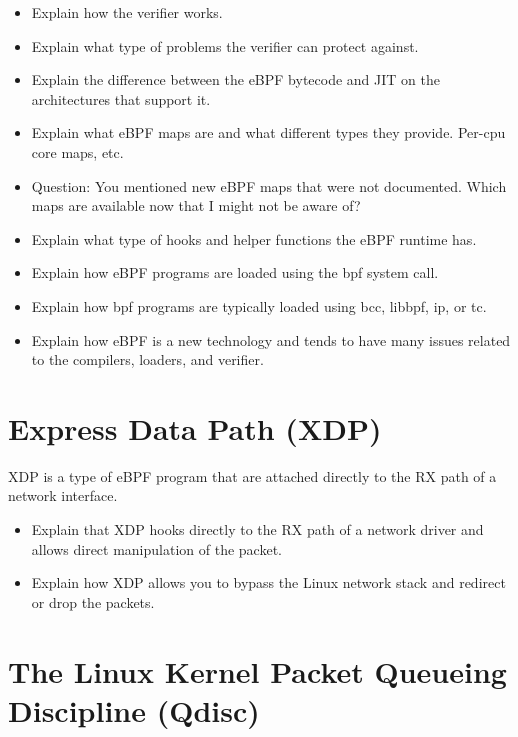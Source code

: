 \documentclass[sigconf, nonacm]{acmart}
\begin{document}
\begin{itemize}
  \item Explain how the verifier works.
  \item Explain what type of problems the verifier can protect against.
  \item Explain the difference between the eBPF bytecode and JIT on the architectures that support it.
  \item Explain what eBPF maps are and what different types they provide. Per-cpu core maps, etc.
  \item Question: You mentioned new eBPF maps that were not documented. Which maps are available now that I might not be aware of?
  \item Explain what type of hooks and helper functions the eBPF runtime has.
  \item Explain how eBPF programs are loaded using the bpf system call.
  \item Explain how bpf programs are typically loaded using bcc, libbpf, ip, or tc.
  \item Explain how eBPF is a new technology and tends to have many issues related to the compilers, loaders, and verifier.
\end{itemize}


\section{Express Data Path (XDP)}

XDP is a type of eBPF program that are attached directly to the RX path of a
network interface.

\begin{itemize}
  \item Explain that XDP hooks directly to the RX path of a network driver and allows direct manipulation of the packet.
  \item Explain how XDP allows you to bypass the Linux network stack and redirect or drop the packets.
\end{itemize}




\section{The Linux Kernel Packet Queueing Discipline (Qdisc)}
\end{document}
